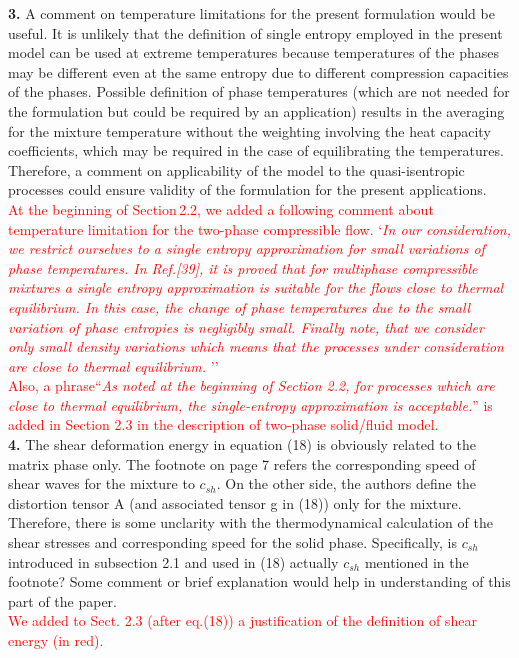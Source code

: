 \documentclass[3p,times,table]{article}
\newcommand{\revOne}[1]{\textcolor{Red}{#1}}
\begin{document}
\textbf{3.}      A comment on temperature limitations for the present formulation would be useful. 
It is 
unlikely that the definition of single entropy employed in the present model can be used at extreme 
temperatures because temperatures of the phases may be different even at the same entropy due to 
different compression capacities of the phases. Possible definition of phase temperatures (which 
are not needed for the formulation but could be required by an application) results in the 
averaging for the mixture temperature without the weighting involving the heat capacity 
coefficients, which may be required in the case of equilibrating the temperatures. Therefore, a 
comment on applicability of the model to the quasi-isentropic processes could ensure validity of 
the formulation for the present applications.
\\
\revOne{At the beginning of Section\,2.2, we added a following 
comment 
about temperature limitation for the two-phase compressible flow. 
	`\textit{In our consideration, we restrict ourselves to a single entropy approximation for small variations of phase temperatures. In Ref.[39], it is proved that 
for multiphase compressible mixtures a single entropy approximation is suitable for the flows close to thermal equilibrium. In this case, the change of phase temperatures due to the small variation of phase entropies is negligibly small.
Finally note, that we consider only small density variations which means that the processes under consideration are close to thermal equilibrium.
	}''\\
	Also, a phrase``\textit{As noted at the beginning of Section 
	2.2, 
	for 
	processes which are close to thermal equilibrium, the 
	single-entropy approximation is acceptable.}'' is added in 
	Section 
	2.3 in the description of two-phase solid/fluid model.
}
\\

\textbf{4.}      The shear deformation energy in equation (18) is obviously related to the matrix 
phase 
only. The footnote on page 7 refers the corresponding speed of shear waves for the mixture to 
$ c_{sh} $. On the other side, the authors define the distortion tensor A (and associated tensor g 
in 
(18)) only for the mixture. Therefore, there is some unclarity with the thermodynamical calculation 
of the shear stresses and corresponding speed for the solid phase. Specifically, is $ c_{sh} $ 
introduced 
in subsection 2.1 and used in (18) actually $ c_{sh} $ mentioned in the footnote? Some comment or 
brief 
explanation would help in understanding of this part of the paper.
\\
\revOne{We added  to Sect. 2.3 (after eq.(18))  a justification of 
the definition of 
shear energy (in red).}
\\
\end{document}
